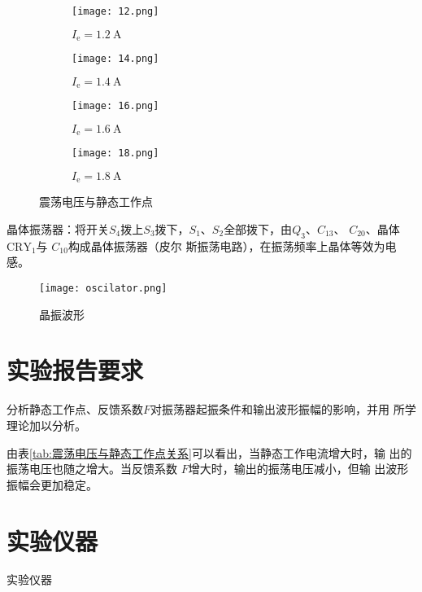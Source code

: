 \documentclass[../main]{subfiles}
\begin{document}
\begin{figure}[htbp]
	\centering
	\begin{subfigure}[htbp]{.45\linewidth}
		\centering
		\texttt{[image: 12.png]}
		\caption{$I_\mathrm{e} = \SI{1.2}{\A}$}
		\label{fig:1.2}
	\end{subfigure}
	\quad
	\begin{subfigure}[htbp]{.45\linewidth}
		\centering
		\texttt{[image: 14.png]}
		\caption{$I_\mathrm{e} = \SI{1.4}{\A}$}
		\label{fig:1.4}
	\end{subfigure}

	\begin{subfigure}[htbp]{.45\linewidth}
		\centering
		\texttt{[image: 16.png]}
		\caption{$I_\mathrm{e} = \SI{1.6}{\A}$}
		\label{fig:1.6}
	\end{subfigure}
	\quad
	\begin{subfigure}[htbp]{.45\linewidth}
		\centering
		\texttt{[image: 18.png]}
		\caption{$I_\mathrm{e} = \SI{1.8}{\A}$}
		\label{fig:1.8}
	\end{subfigure}
	\caption{震荡电压与静态工作点}
	\label{fig:震荡电压与静态工作点}
\end{figure}

晶体振荡器：将开关$ S_4 $拨上$ S_3 $拨下，$ S_1 $、$ S_2 $全部拨下，由$ Q_3 $、$
C_{13} $、 $ C_{20} $、晶体 $ \mathrm{CRY}_1 $与 $ C_{10} $构成晶体振荡器（皮尔
斯振荡电路），在振荡频率上晶体等效为电感。

\begin{figure}[htbp]
	\centering
	\texttt{[image: oscilator.png]}
	\caption{晶振波形}
	\label{fig:晶振波形}
\end{figure}

\section{实验报告要求}%
\label{sec:\arabic{chapter}实验报告要求}

\begin{Exercise}

	分析静态工作点、反馈系数$ F $对振荡器起振条件和输出波形振幅的影响，并用
	所学理论加以分析。

\end{Exercise}

\begin{Answer}

	由表\ref{tab:震荡电压与静态工作点关系}可以看出，当静态工作电流增大时，输
	出的振荡电压也随之增大。当反馈系数 $ F $增大时，输出的振荡电压减小，但输
	出波形振幅会更加稳定。

\end{Answer}

\section{实验仪器}%
\label{sec:\arabic{chapter}实验仪器}

\begin{table}[htbp]
	\centering
	\caption{实验仪器}
	\label{tab:\arabic{chapter}实验仪器}
\end{table}
\end{document}
